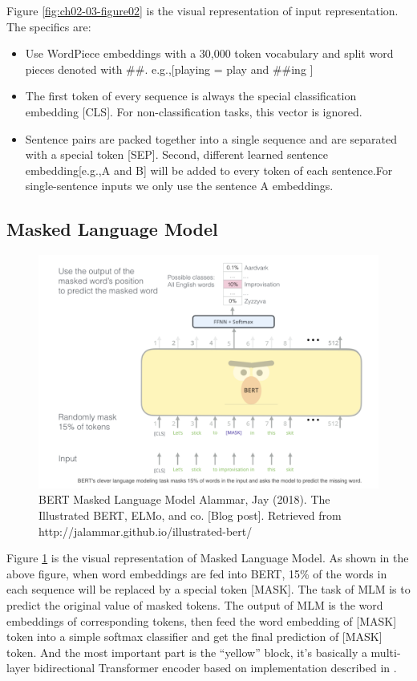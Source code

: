 \documentclass[]{krantz}
\begin{document}
Figure \ref{fig:ch02-03-figure02} is the visual representation of input representation. The specifics are:

\begin{itemize}
\item
  Use WordPiece embeddings \citet{wu2016google} with a 30,000 token vocabulary and split word pieces denoted with \#\#. e.g.,{[}playing = play and \#\#ing {]}
\item
  The first token of every sequence is always the special classification embedding {[}CLS{]}. For non-classification tasks, this vector is ignored.
\item
  Sentence pairs are packed together into a single sequence and are separated with a special token {[}SEP{]}. Second, different learned sentence embedding{[}e.g.,A and B{]} will be added to every token of each sentence.For single-sentence inputs we only use the sentence A embeddings.
\end{itemize}

\hypertarget{masked-language-model}{%
\subsection{Masked Language Model}\label{masked-language-model}}

\begin{figure}

{\centering \includegraphics[width=0.7\linewidth]{figures/02-03-transfer-learning-for-nlp/bert_masked_task} 

}

\caption{BERT Masked Language Model  
 Alammar, Jay (2018). The Illustrated BERT, ELMo, and co. [Blog post]. Retrieved from http://jalammar.github.io/illustrated-bert/}\label{fig:ch02-03-figure03}
\end{figure}

Figure \ref{fig:ch02-03-figure03} is the visual representation of Masked Language Model.
As shown in the above figure, when word embeddings are fed into BERT, 15\% of the words in each sequence will be replaced by a special token {[}MASK{]}. The task of MLM is to predict the original value of masked tokens. The output of MLM is the word embeddings of corresponding tokens, then feed the word embedding of {[}MASK{]} token into a simple softmax classifier and get the final prediction of {[}MASK{]} token. And the most important part is the ``yellow'' block, it's basically a multi-layer bidirectional Transformer encoder based on implementation described in \citet{kaiser2017one}.
\end{document}
